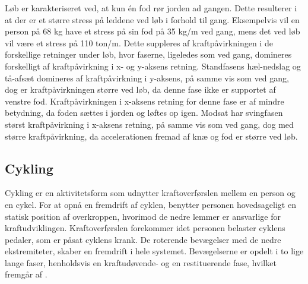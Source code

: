 Løb er karakteriseret ved, at kun én fod rør jorden ad gangen. Dette resulterer i at der er et større stress på leddene ved løb i forhold til gang. Eksempelvis vil en person på 68 kg have et stress på sin fod på 35 kg/m ved gang, mens det ved løb vil være et stress på 110 ton/m. \citep{Adelaar1986}
Dette suppleres af kraftpåvirkningen i de forskellige retninger under løb, hvor faserne, ligeledes som ved gang, domineres forskelligt af kraftpåvirkning i x- og y-aksens retning. \newline 
Standfasens hæl-nedslag og tå-afsæt domineres af kraftpåvirkning i y-aksens, på samme vis som ved gang, dog er kraftpåvirkningen større ved løb, da denne fase ikke er supportet af venstre fod. Kraftpåvirkningen i x-aksens retning for denne fase er af mindre betydning, da foden sættes i jorden og løftes op igen. 
Modsat har svingfasen størst kraftpåvirkning i x-aksens retning, på samme vis som ved gang, dog med større kraftpåvirkning, da accelerationen fremad af knæ og fod er større ved løb. \citep{Rueterbories2010} 


\subsection{Cykling}
Cykling er en aktivitetsform som udnytter kraftoverførslen mellem en person og en cykel. For at opnå en fremdrift af cyklen, benytter personen hovedsageligt en statisk position af overkroppen, hvorimod de nedre lemmer er ansvarlige for kraftudviklingen. \citep{Springer2014} \newline 
Kraftoverførslen forekommer idet personen belaster cyklens pedaler, som er påsat cyklens krank. De roterende bevægelser med de nedre ekstremiteter, skaber en fremdrift i hele systemet. Bevægelserne er opdelt i to lige lange faser, henholdsvis en kraftudøvende- og en restituerende fase, hvilket fremgår af .

